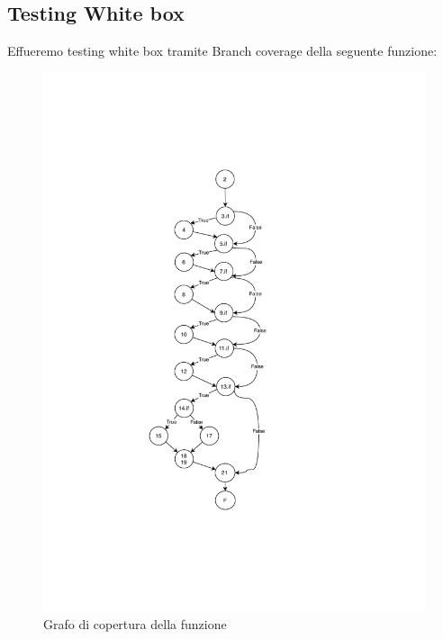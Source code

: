 \pagebreak
\subsection{Testing White box}
Effueremo testing white box tramite Branch coverage della seguente funzione:



\begin{center}
    \begin{figure}[h]
        \centering
        \caption{Grafo di copertura della funzione}
        \includegraphics[width=\textwidth,height=\textheight]{Figures/Grafo di copertura.pdf}
    \end{figure}
\end{center}